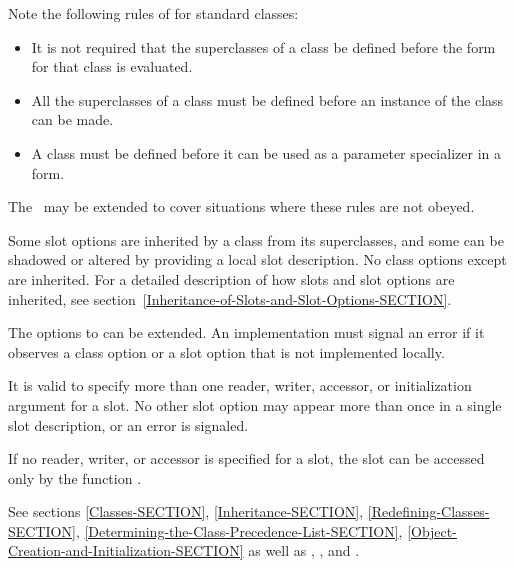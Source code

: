 \begin{defmac}
Note the following rules of  for standard classes:

\begin{itemize}

\item 
It is not required that the superclasses of a class be defined before
the  form for that class is evaluated.

\item 
All the superclasses of a class must be defined before 
an instance of the class can be made.

\item 
A class must be defined before it can be used as a parameter
specializer in a  form.

\end{itemize}

The \OS\ may be extended to cover situations where these rules are not
obeyed.

Some slot options are inherited by a class from its superclasses, and
some can be shadowed or altered by providing a local slot description.
No class options except  are inherited.  For a
detailed description of how slots and slot options are inherited, see
section~\ref{Inheritance-of-Slots-and-Slot-Options-SECTION}.

The options to  can be extended.
An implementation must signal an error if it observes a class option or
a slot option that is not implemented locally.

It is valid to specify more than one reader, writer, accessor, or
initialization argument for a slot.  No other slot option may appear
more than once in a single slot description, or an error is
signaled.

If no reader, writer, or accessor is specified for a slot, the slot
can be accessed only by the function .

See sections \ref{Classes-SECTION},
\ref{Inheritance-SECTION},
\ref{Redefining-Classes-SECTION},
\ref{Determining-the-Class-Precedence-List-SECTION},
\ref{Object-Creation-and-Initialization-SECTION} as well as
,
, and
.
\end{defmac}



